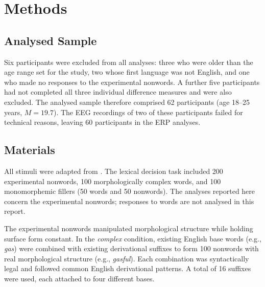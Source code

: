 \documentclass[utf8]{FrontiersinHarvard} %
\begin{document}

\section{Methods}


\subsection{Analysed Sample}

Six participants were excluded from all analyses: three who were older than the age range set for the study, two whose first language was not English, and one who made no responses to the experimental nonwords. A further five participants had not completed all three individual difference measures and were also excluded. The analysed sample therefore comprised 62 participants (age 18--25 years, $M = 19.7$). The EEG recordings of two of these participants failed for technical reasons, leaving 60 participants in the ERP analyses. %

\subsection{Materials}

All stimuli were adapted from \citet{sawiIndividualDifferencesSensitivity2016}. The lexical decision task included 200 experimental nonwords, 100 morphologically complex words, and 100 monomorphemic fillers (50 words and 50 nonwords). The analyses reported here concern the experimental nonwords; responses to words are not analysed in this report.

The experimental nonwords manipulated morphological structure while holding surface form constant. In the \textit{complex} condition, existing English base words (e.g., \textit{gas}) were combined with existing derivational suffixes to form 100 nonwords with real morphological structure (e.g., \textit{gasful}). Each combination was syntactically legal and followed common English derivational patterns. A total of 16 suffixes were used, each attached to four different bases. %
\end{document}
